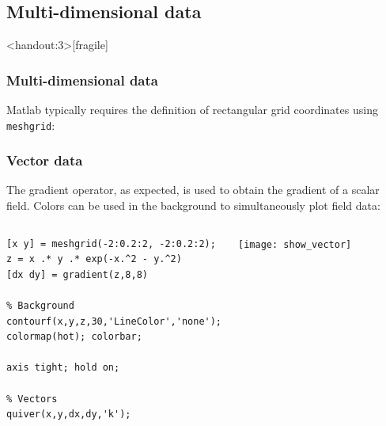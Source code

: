 \subsection*{Multi-dimensional data}
\begin{frame}<handout:3>[fragile]
  \frametitle{Multi-dimensional data}
  Matlab typically requires the definition of rectangular grid coordinates using \lstinline$meshgrid$:\\
  \begin{overlayarea}{\textwidth}{6cm}
 \end{overlayarea}
\end{frame}

\begin{frame}[fragile]
  \frametitle{Vector data}
  The gradient operator, as expected, is used to obtain the gradient of a scalar field. Colors can be used in the background to simultaneously plot field data:
  \begin{columns}[T]
    \begin{lstlisting}
[x y] = meshgrid(-2:0.2:2, -2:0.2:2);
z = x .* y .* exp(-x.^2 - y.^2)
[dx dy] = gradient(z,8,8)

% Background
contourf(x,y,z,30,'LineColor','none');
colormap(hot); colorbar;

axis tight; hold on;

% Vectors
quiver(x,y,dx,dy,'k');
    \end{lstlisting}
   \begin{center}
      \texttt{[image: show\_vector]}
    \end{center}
  \end{columns}
\end{frame}

